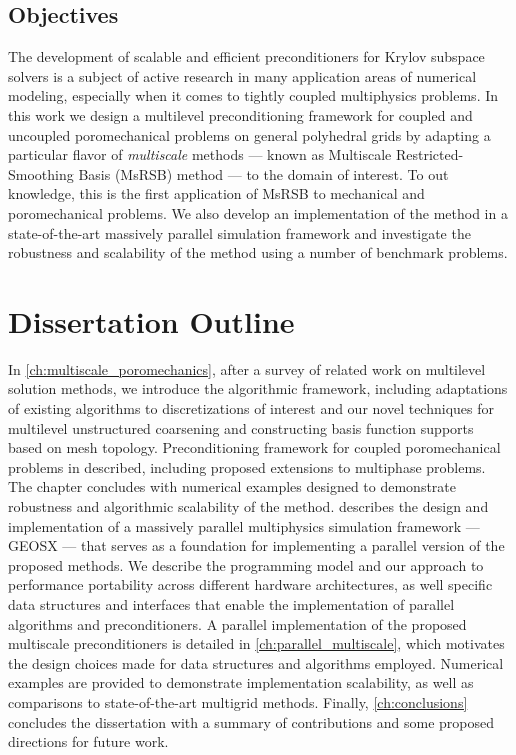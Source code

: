 \subsection{Objectives }
\label{subsec:intro_problem_objective}

The development of scalable and efficient preconditioners for Krylov subspace solvers is a subject of active research in many application areas of numerical modeling, especially when it comes to tightly coupled multiphysics problems.   In this work we design a multilevel preconditioning framework for coupled and uncoupled poromechanical problems on general polyhedral grids by adapting a particular flavor of \textit{multiscale} methods --- known as Multiscale Restricted-Smoothing Basis (MsRSB) method --- to the domain of interest.   To out knowledge, this is the first application of MsRSB to mechanical and poromechanical problems.   We also develop an implementation of the method in a state-of-the-art massively parallel simulation framework and investigate the robustness and scalability of the method using a number of benchmark problems.

\section{Dissertation Outline}
\label{sec:intro_outline}

In \cref{ch:multiscale_poromechanics}, after a survey of related work on multilevel solution methods, we introduce the algorithmic framework, including adaptations of existing algorithms to discretizations of interest and our novel techniques for multilevel unstructured coarsening and constructing basis function supports based on mesh topology.   Preconditioning framework for coupled poromechanical problems in described, including proposed extensions to multiphase problems.   The chapter concludes with numerical examples designed to demonstrate robustness and algorithmic scalability of the method.    describes the design and implementation of a massively parallel multiphysics simulation framework --- GEOSX --- that serves as a foundation for implementing a parallel version of the proposed methods.   We describe the programming model and our approach to performance portability across different hardware architectures, as well specific data structures and interfaces that enable the implementation of parallel algorithms and preconditioners.   A parallel implementation of the proposed multiscale preconditioners is detailed in \cref{ch:parallel_multiscale}, which motivates the design choices made for data structures and algorithms employed.   Numerical examples are provided to demonstrate implementation scalability, as well as comparisons to state-of-the-art multigrid methods.   Finally, \cref{ch:conclusions} concludes the dissertation with a summary of contributions and some proposed directions for future work.